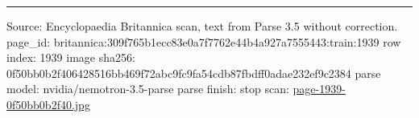 \documentclass[10pt]{article}
\begin{document}
\vfill\par\noindent\rule{\linewidth}{0.4pt}\par
{\scriptsize\color{gray}\noindent Source: Encyclopaedia Britannica scan, text from Parse 3.5 without correction. page\_id: britannica:309f765b1ecc83e0a7f7762e44b4a927a7555443:train:1939 \quad row index: 1939 \quad image sha256: 0f50bb0b2f406428516bb469f72abc9fc9fa54cdb87fbdff0adae232ef9c2384 \quad parse model: nvidia/nemotron-3.5-parse \quad parse finish: stop \quad scan: \href{../scans/page-1939-0f50bb0b2f40.jpg}{page-1939-0f50bb0b2f40.jpg}\par}
\end{document}
